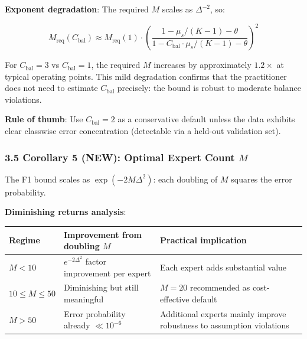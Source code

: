 \documentclass[
  12pt,
]{ctexart}
\begin{document}
\textbf{Exponent degradation}: The required \(M\) scales as
\(\Delta^{-2}\), so:

\[M_{\text{req}}(C_{\text{bal}}) \approx M_{\text{req}}(1) \cdot \left(\frac{1 - \mu_s/(K-1) - \theta}{1 - C_{\text{bal}} \cdot \mu_s/(K-1) - \theta}\right)^2\]

For \(C_{\text{bal}} = 3\) vs \(C_{\text{bal}} = 1\), the required \(M\)
increases by approximately \(1.2\times\) at typical operating points.
This mild degradation confirms that the practitioner does not need to
estimate \(C_{\text{bal}}\) precisely: the bound is robust to moderate
balance violations.

\textbf{Rule of thumb}: Use \(C_{\text{bal}} = 2\) as a conservative
default unless the data exhibits clear classwise error concentration
(detectable via a held-out validation set).

\subsubsection{\texorpdfstring{3.5 Corollary 5 (NEW): Optimal Expert
Count
\(M\)}{3.5 Corollary 5 (NEW): Optimal Expert Count M}}\label{corollary-5-new-optimal-expert-count-m}

The F1 bound scales as \(\exp(-2M\Delta^2)\): each doubling of \(M\)
squares the error probability.

\textbf{Diminishing returns analysis}:

\begin{longtable}[]{@{}
  >{\raggedright\arraybackslash}p{}
  >{\raggedright\arraybackslash}p{}
  >{\raggedright\arraybackslash}p{}@{}}
\toprule\noalign{}
\begin{minipage}[b]{\linewidth}\raggedright
Regime
\end{minipage} & \begin{minipage}[b]{\linewidth}\raggedright
Improvement from doubling \(M\)
\end{minipage} & \begin{minipage}[b]{\linewidth}\raggedright
Practical implication
\end{minipage} \\
\midrule\noalign{}
\endhead
\bottomrule\noalign{}
\endlastfoot
\(M < 10\) & \(e^{-2\Delta^2}\) factor improvement per expert & Each
expert adds substantial value \\
\(10 \leq M \leq 50\) & Diminishing but still meaningful & \(M=20\)
recommended as cost-effective default \\
\(M > 50\) & Error probability already \(\ll 10^{-6}\) & Additional
experts mainly improve robustness to assumption violations \\
\end{longtable}
\end{document}
